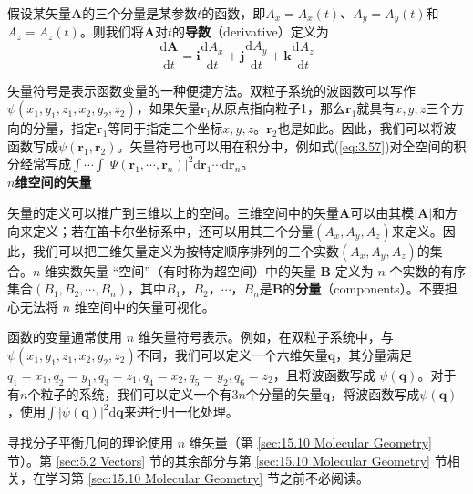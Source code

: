     假设某矢量$\mathbf{A}$的三个分量是某参数$t$的函数，即$A_x = A_x\left(t\right)$、$A_y = A_y\left(t\right)$和$A_z = A_z\left(t\right)$。则我们将$\mathbf{A}$对$t$的\textbf{导数}（derivative）定义为
    \begin{equation}
        \frac{\mathrm{d}\mathbf{A}}{\mathrm{d}t} = \mathbf{i}\frac{\mathrm{d}A_x}{\mathrm{d}t} + \mathbf{j}\frac{\mathrm{d}A_y}{\mathrm{d}t} + \mathbf{k}\frac{\mathrm{d}A_z}{\mathrm{d}t}
        \label{eq:5.32}
    \end{equation}

    矢量符号是表示函数变量的一种便捷方法。双粒子系统的波函数可以写作$\psi\left(x_1,y_1,z_1,x_2,y_2,z_2\right)$，如果矢量$\mathbf{r}_1$从原点指向粒子1，那么$\mathbf{r}_1$就具有$x,y,z$三个方向的分量，指定$\mathbf{r}_1$等同于指定三个坐标$x,y,z$。$\mathbf{r}_2$也是如此。因此，我们可以将波函数写成$\psi\left(\mathbf{r}_1,\mathbf{r}_2\right)$。矢量符号也可以用在积分中，例如式(\ref{eq:3.57})对全空间的积分经常写成$\int \cdots \int\left|\Psi\left(\mathbf{r}_1,\cdots,\mathbf{r}_n\right)\right|^2\mathrm{d}\mathbf{r}_1\cdots\mathrm{d}\mathbf{r}_n$。
    \\
    
    \noindent\textbf{$n$维空间的矢量}

    矢量的定义可以推广到三维以上的空间。三维空间中的矢量$\mathbf{A}$可以由其模$\left|\mathbf{A}\right|$和方向来定义；若在笛卡尔坐标系中，还可以用其三个分量$\left(A_x,A_y,A_z\right)$来定义。因此，我们可以把三维矢量定义为按特定顺序排列的三个实数$\left(A_x,A_y,A_z\right)$的集合。$n$ 维实数矢量 “空间”（有时称为超空间）中的矢量 $\mathbf{B}$ 定义为 $n$ 个实数的有序集合$\left(B_1,B_2,\cdots,B_n\right)$，其中$B_1$，$B_2$，$\cdots$，$B_n$是$\mathbf{B}$的\textbf{分量}（components）。不要担心无法将 $n$ 维空间中的矢量可视化。

    函数的变量通常使用 $n$ 维矢量符号表示。例如，在双粒子系统中，与$\psi\left(x_1,y_1,z_1,x_2,y_2,z_2\right)$不同，我们可以定义一个六维矢量$\mathbf{q}$，其分量满足$q_1=x_1, q_2=y_1, q_3=z_1, q_4=x_2, q_5=y_2, q_6=z_2$，且将波函数写成 $\psi\left(\mathbf{q}\right)$。对于有$n$个粒子的系统，我们可以定义一个有$3n$个分量的矢量$\mathbf{q}$，将波函数写成$\psi\left(\mathbf{q}\right)$，使用$\int\left|\psi\left(\mathbf{q}\right)\right|^2\mathrm{d}\mathbf{q}$来进行归一化处理。

    寻找分子平衡几何的理论使用 $n$ 维矢量（第 \ref{sec:15.10 Molecular Geometry} 节）。第 \ref{sec:5.2 Vectors} 节的其余部分与第 \ref{sec:15.10 Molecular Geometry} 节相关，在学习第 \ref{sec:15.10 Molecular Geometry} 节之前不必阅读。

